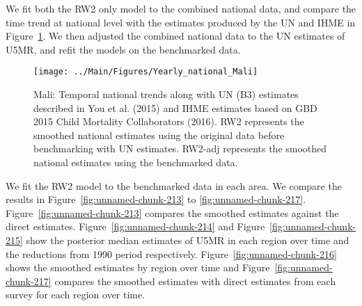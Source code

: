 \documentclass[12pt]{article}\usepackage[]{graphicx}\usepackage[]{color}
\newenvironment{knitrout}{}{} %
\begin{document}
We fit both the RW2 only model to the combined national data, and compare the time trend at national level with the estimates produced by the UN and IHME in Figure~\ref{fig:unnamed-chunk-212}. We then adjusted the combined national data to the UN estimates of U5MR, and refit the models on the benchmarked data. 

\begin{knitrout}
\color{fgcolor}\begin{figure}[bht]

{\centering \texttt{[image: ../Main/Figures/Yearly\_national\_Mali]} 

}

\caption[Mali]{Mali: Temporal national trends along with UN (B3) estimates described in You et al. (2015) and IHME estimates based on GBD 2015 Child Mortality Collaborators (2016). RW2 represents the smoothed national estimates using the original data before benchmarking with UN estimates. RW2-adj represents the smoothed national estimates using the benchmarked data.}\label{fig:unnamed-chunk-212}
\end{figure}


\end{knitrout}
 

We fit the RW2 model to the benchmarked data in each area. 
We compare the results in Figure~\ref{fig:unnamed-chunk-213} to \ref{fig:unnamed-chunk-217}.
Figure~\ref{fig:unnamed-chunk-213} compares the smoothed estimates against the direct estimates. Figure~\ref{fig:unnamed-chunk-214} and Figure~\ref{fig:unnamed-chunk-215} show the posterior median estimates of U5MR in each region over time and the reductions from 1990 period respectively.
Figure~\ref{fig:unnamed-chunk-216} shows the smoothed estimates by region over time and Figure~\ref{fig:unnamed-chunk-217} compares the smoothed estimates with direct estimates from each survey for each region over time.




\end{document}
